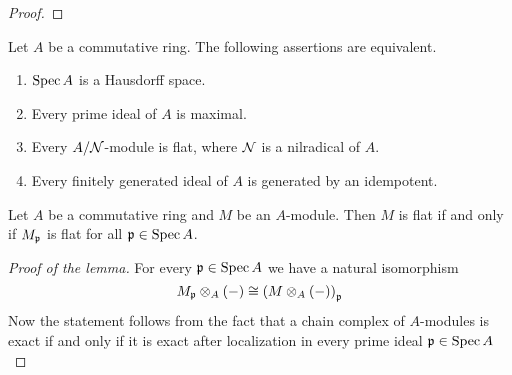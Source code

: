 \begin{proof}
\end{proof}

\begin{theorem}
Let $A$ be a commutative ring. The following assertions are equivalent.
\begin{enumerate}[label=\emph{\textbf{(\roman*)}}, leftmargin=3.0em]
\item $\mathrm{Spec}\, A$ is a Hausdorff space.
\item Every prime ideal of $A$ is maximal.
\item Every $A/{\mathcal N}$-module is flat, where ${\mathcal N}$ is a nilradical of $A$.
\item Every finitely generated ideal of $A$ is generated by an idempotent.
\end{enumerate}
\end{theorem}

\begin{lemma}\label{lemma:flatness_in_stalks}
Let $A$ be a commutative ring and $M$ be an $A$-module. Then $M$ is flat if and only if $M_{\mathfrak{p}}$ is flat for all $\mathfrak{p}\in \mathrm{Spec}\, A$.
\end{lemma}
\begin{proof}[Proof of the lemma]
For every $\mathfrak{p}\in \mathrm{Spec}\, A$ we have a natural isomorphism
$$M_{\mathfrak{p}}\otimes_A(-) \cong \left(M\otimes_A(-)\right)_{\mathfrak{p}}$$
Now the statement follows from the fact that a chain complex of $A$-modules is exact if and only if it is exact after localization in every prime ideal $\mathfrak{p}\in \mathrm{Spec}\, A$
\end{proof}

